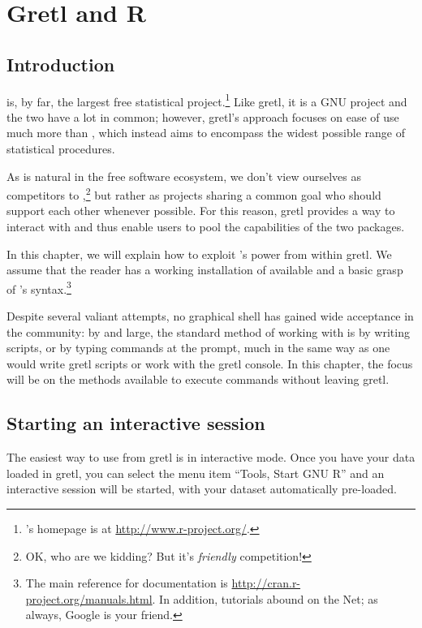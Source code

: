 \chapter{Gretl and R}
\label{chap:gretlR}

\section{Introduction}
\label{R-intro}

 is, by far, the largest free statistical
project.\footnote{'s homepage is at
  \url{http://www.r-project.org/}.} Like gretl, it is a GNU project
and the two have a lot in common; however, gretl's approach focuses on
ease of use much more than , which instead aims to encompass
the widest possible range of statistical procedures.

As is natural in the free software ecosystem, we don't view ourselves
as competitors to ,\footnote{OK, who are we kidding? But it's
  \emph{friendly} competition!} but rather as projects sharing a
common goal who should support each other whenever possible. For this
reason, gretl provides a way to interact with  and thus enable
users to pool the capabilities of the two packages.

In this chapter, we will explain how to exploit 's power from
within gretl. We assume that the reader has a working installation of
 available and a basic grasp of 's syntax.\footnote{The
  main reference for  documentation is
  \url{http://cran.r-project.org/manuals.html}.  In addition, 
  tutorials abound on the Net; as always, Google is your friend.}

Despite several valiant attempts, no graphical shell has gained wide
acceptance in the  community: by and large, the standard method
of working with  is by writing scripts, or by typing commands
at the  prompt, much in the same way as one would write
gretl scripts or work with the gretl console. In this
chapter, the focus will be on the methods available to execute 
commands without leaving gretl.

\section{Starting an interactive  session}
\label{sec:R-interactive}

The easiest way to use  from gretl is in interactive
mode.  Once you have your data loaded in gretl, you can select
the menu item ``Tools, Start GNU R'' and an interactive 
session will be started, with your dataset automatically pre-loaded.

